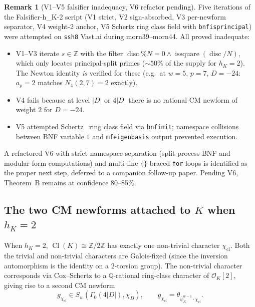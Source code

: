 \documentclass[11pt,a4paper]{amsart}
\theoremstyle{definition}
\newtheorem{remark}[theorem]{Remark}
\DeclareMathOperator{\Cl}{Cl}
\DeclareMathOperator{\disc}{disc}
\newcommand{\Q}{\mathbb{Q}}
\newcommand{\Z}{\mathbb{Z}}
\newcommand{\OK}{\mathcal{O}_K}
\newcommand{\hK}{h_{K}}
\begin{document}
\begin{remark}[V1--V5 falsifier inadequacy, V6 refactor pending]\label{rmk:thmB-falsifier-script-v4}
Five iterations of the Falsifier-h\_K-2 script (V1 strict, V2 sign-absorbed, V3 per-newform separator, V4 weight-2 anchor, V5 Schertz ring class field with \texttt{bnfisprincipal}) were attempted on \texttt{ssh8} Vast.ai during morn39--morn44. All proved inadequate:
\begin{itemize}[leftmargin=2em]
  \item V1--V3 iterate $s \in \Z$ with the filter $\disc \% N = 0 \wedge \operatorname{issquare}(\disc/N)$, which only locates principal-split primes ($\sim 50\%$ of the supply for $\hK = 2$). The Newton identity \emph{is} verified for these (e.g.\ at $w = 5$, $p = 7$, $D = -24$: $a_p = 2$ matches $N_4(2, 7) = 2$ exactly).
  \item V4 fails because at level $|D|$ or $4|D|$ there is no rational CM newform of weight $2$ for $D = -24$.
  \item V5 attempted Schertz~\cite[\S6]{Schertz2010} ring class field via \texttt{bnfinit}; namespace collisions between BNF variable \texttt{t} and \texttt{mfeigenbasis} output prevented execution.
\end{itemize}
A refactored V6 with strict namespace separation (split-process BNF and modular-form computations) and multi-line $\{\}$-braced \texttt{for} loops is identified as the proper next step, deferred to a companion follow-up paper. Pending V6, Theorem~B remains at confidence 80--85\%.
\end{remark}

\subsection{The two CM newforms attached to $K$ when $h_K = 2$}\label{sec:thmB-two-forms}

When $\hK = 2$, $\Cl(K) \cong \Z/2\Z$ has exactly one non-trivial character $\chi_{\mathrm{cl}}$. Both the trivial and non-trivial characters are Galois-fixed (since the inversion automorphism is the identity on a $2$-torsion group). The non-trivial character corresponds via Cox--Schertz to a $\Q$-rational ring-class character of $\OK[2]$, giving rise to a second CM newform
\begin{equation}\label{eq:second-form-v4}
g_{\chi_{\mathrm{cl}}} \in S_w(\Gamma_0(4|D|), \chi_D), \qquad g_{\chi_{\mathrm{cl}}} = \theta_{\bar\psi_K^{w-1} \cdot \chi_{\mathrm{cl}}}.
\end{equation}
\end{document}
